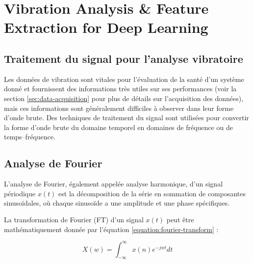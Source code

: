 \chapter{Vibration Analysis \& Feature Extraction for Deep Learning}


\section{Traitement du signal pour l'analyse vibratoire}
Les données de vibration sont vitales pour l'évaluation de la santé d'un système donné et fournissent des informations très utiles sur ses performances (voir la section \ref{sec:data-acquisition} pour plus de détails sur l'acquisition des données), mais ces informations sont généralement difficiles à observer dans leur forme d'onde brute. Des techniques de traitement du signal sont utilisées pour convertir la forme d'onde brute du domaine temporel en domaines de fréquence ou de temps–fréquence.

\section{Analyse de Fourier}
L'analyse de Fourier, également appelée analyse harmonique, d'un signal périodique $x(t)$ est la décomposition de la série en sommation de composantes sinusoïdales, où chaque sinusoïde a une amplitude et une phase spécifiques.

La transformation de Fourier (FT) d'un signal $x(t)$ peut être mathématiquement donnée par l'équation \ref{equation:fourier-transform} :

\begin{equation}
    X(w) = \int_{-\infty}^{\infty}x(n)e^{-jwt}dt
    \label{equation:fourier-transform}
\end{equation}

